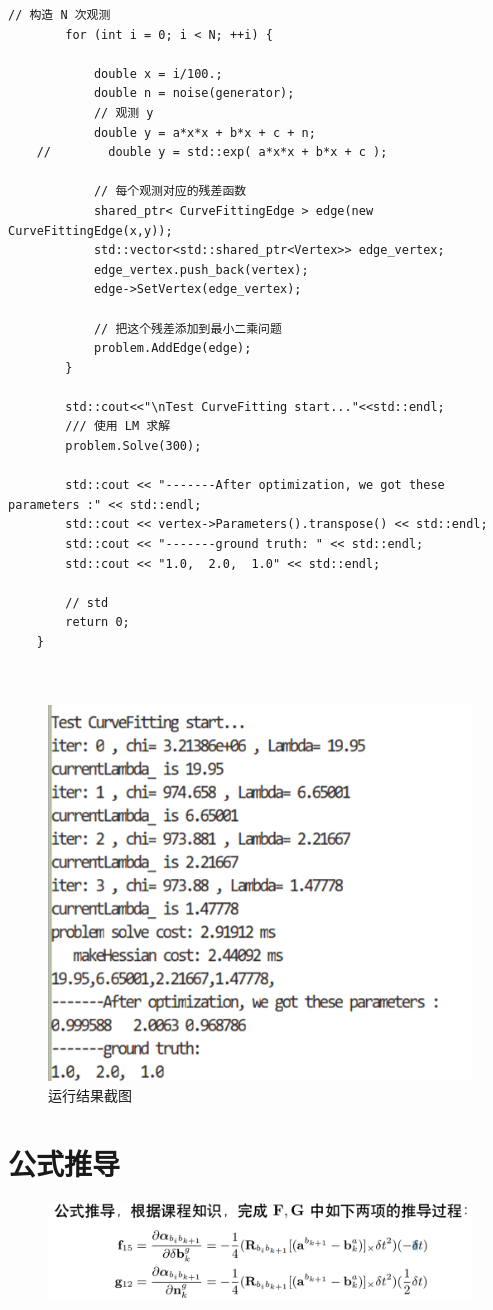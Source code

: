 \documentclass[oneside]{article}
\begin{document}
\begin{lstlisting}[caption={}]
        // 构造 N 次观测
        for (int i = 0; i < N; ++i) {
    
            double x = i/100.;
            double n = noise(generator);
            // 观测 y
            double y = a*x*x + b*x + c + n;
    //        double y = std::exp( a*x*x + b*x + c );
    
            // 每个观测对应的残差函数
            shared_ptr< CurveFittingEdge > edge(new CurveFittingEdge(x,y));
            std::vector<std::shared_ptr<Vertex>> edge_vertex;
            edge_vertex.push_back(vertex);
            edge->SetVertex(edge_vertex);
    
            // 把这个残差添加到最小二乘问题
            problem.AddEdge(edge);
        }
    
        std::cout<<"\nTest CurveFitting start..."<<std::endl;
        /// 使用 LM 求解
        problem.Solve(300);
    
        std::cout << "-------After optimization, we got these parameters :" << std::endl;
        std::cout << vertex->Parameters().transpose() << std::endl;
        std::cout << "-------ground truth: " << std::endl;
        std::cout << "1.0,  2.0,  1.0" << std::endl;
    
        // std
        return 0;
    }
    
    
\end{lstlisting}

\begin{figure}[htbp]
    \centering
    \includegraphics[width=.5\linewidth]{figures/fig2.png}    
    \caption{运行结果截图}
\end{figure}

\section{公式推导}
\begin{figure}[htbp]
    \centering
    \includegraphics[width=.8\linewidth]{figures/fig3.png}    
\end{figure}
\end{document}
